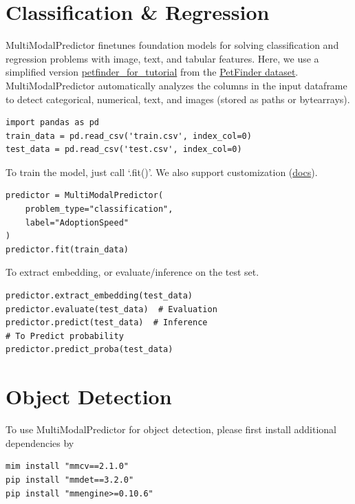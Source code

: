\section*{Classification \& Regression}
MultiModalPredictor finetunes foundation models for solving classification and regression problems with image, text, and tabular features. Here, we use a simplified version \href{https://automl-mm-bench.s3.amazonaws.com/petfinder_for_tutorial.zip}{petfinder\_for\_tutorial} from the \href{https://www.kaggle.com/c/petfinder-adoption-prediction}{PetFinder dataset}. MultiModalPredictor automatically analyzes the columns in the input dataframe to detect categorical, numerical, text, and images (stored as paths or bytearrays).
\begin{verbatim}
import pandas as pd
train_data = pd.read_csv('train.csv', index_col=0)
test_data = pd.read_csv('test.csv', index_col=0)
\end{verbatim}

To train the model, just call `.fit()'. We also support customization (\href{https://auto.gluon.ai/stable/tutorials/multimodal/advanced_topics/customization.html}{docs}).

\begin{verbatim}
predictor = MultiModalPredictor(
    problem_type="classification", 
    label="AdoptionSpeed"
)
predictor.fit(train_data)
\end{verbatim}

To extract embedding, or evaluate/inference on the test set.

\begin{verbatim}
predictor.extract_embedding(test_data)
predictor.evaluate(test_data)  # Evaluation
predictor.predict(test_data)  # Inference
# To Predict probability
predictor.predict_proba(test_data)
\end{verbatim}


\section*{Object Detection}
To use MultiModalPredictor for object detection, please first install additional dependencies by
\begin{verbatim}
mim install "mmcv==2.1.0"
pip install "mmdet==3.2.0"
pip install "mmengine>=0.10.6"
\end{verbatim}


